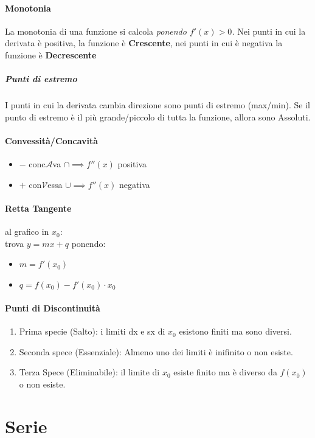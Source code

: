 \documentclass[12pt, a4paper]{article}
\begin{document}
\paragraph*{Monotonia}
La monotonia di una funzione si calcola \emph{ponendo $f'(x)>0$.}
Nei punti in cui la derivata è positiva, la funzione è \textbf{Crescente}, nei punti in cui è negativa la funzione è \textbf{Decrescente}
\subparagraph*{Punti di estremo} I punti in cui la derivata cambia direzione sono punti di estremo (max/min).
Se il punto di estremo è il più grande/piccolo di tutta la funzione, allora sono Assoluti.

\paragraph*{Convessità/Concavità}
\begin{itemize}
	\item $-$ conc$\mathcal{A}$va $\cap \implies f''(x)$ positiva 
	\item $+$ con$\mathcal{V}$essa $\cup \implies f''(x)$ negativa
\end{itemize}


\paragraph*{Retta Tangente} al grafico in $x_0$:\\
trova $y=mx + q$ ponendo:
\begin{itemize}
	\item $m=f'(x_0)$
	\item $q=f(x_0)-f'(x_0)\cdot x_0$
\end{itemize}

\paragraph*{\textbf{Punti di Discontinuità}}
\begin{enumerate}
	\item Prima specie (Salto): i limiti dx e sx di $x_0$ esistono finiti ma sono diversi.
	\item Seconda spece (Essenziale): Almeno uno dei limiti è inifinito o non esiste.
	\item Terza Spece (Eliminabile): il limite di $x_0$ esiste finito ma è diverso da $f(x_0)$ o non esiste.
\end{enumerate}

\section*{Serie}
\end{document}
